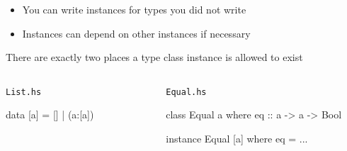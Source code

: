 \documentclass[usenames,dvipsnames,svgnames,table,aspectratio=169,mathserif]{beamer}
\newcommand{\nl}{\vspace{\baselineskip}}
\begin{document}
\begin{frame}

\begin{itemize}
\item You can write instances for types you did not write
\item Instances can depend on other instances if necessary
\end{itemize}

\end{frame}


\begin{frame}[fragile]

There are exactly two places a type class instance is allowed to exist

\nl

\begin{columns}
\begin{column}[T]{0.49\textwidth}
\begin{block}{\tt List.hs}
\begin{haskellcode}
data [a] = []
         | (a:[a])
\end{haskellcode}
\end{block}
\end{column}
\begin{column}{0.02\textwidth}
\end{column}
\begin{column}[T]{0.49\textwidth}
\begin{block}{\tt Equal.hs}
\begin{haskellcode}
class Equal a where
  eq :: a -> a -> Bool

instance Equal [a] where
  eq = ...
\end{haskellcode}
\end{block}
\end{column}
\end{columns}

\end{frame}
\end{document}
